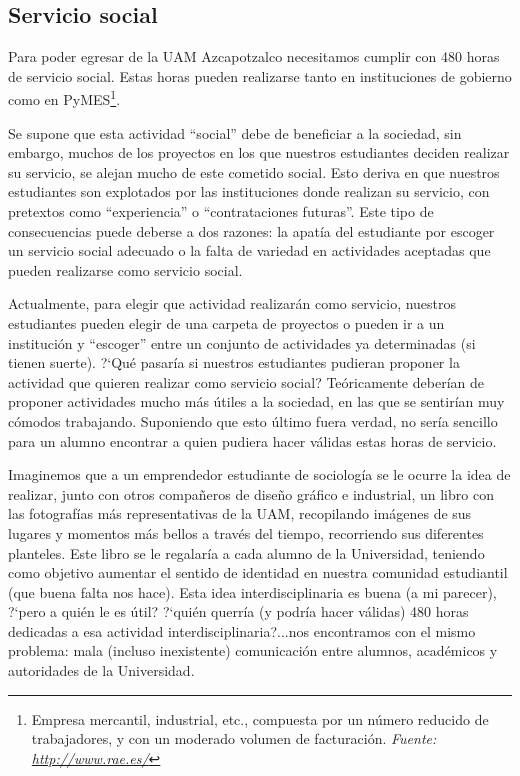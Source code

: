 \documentclass[11pt,letterpaper,titlepage]{article}
\begin{document}
\subsection{Servicio social}

Para poder egresar de la UAM Azcapotzalco necesitamos cumplir con 480 horas de servicio social. Estas horas pueden realizarse tanto en instituciones de gobierno como en PyMES\footnote{Empresa mercantil, industrial, etc., compuesta por un n\'umero reducido de trabajadores, y con un moderado volumen de facturaci\'on. \textit{Fuente: \href{http://www.rae.es/}{http://www.rae.es/}}}.

Se supone que esta actividad ``social'' debe de beneficiar a la sociedad, sin embargo, muchos de los proyectos en los que nuestros estudiantes deciden realizar su servicio, se alejan mucho de este cometido social. Esto deriva en que nuestros estudiantes son explotados por las instituciones donde realizan su servicio, con pretextos como ``experiencia'' o ``contrataciones futuras''. Este tipo de consecuencias puede deberse a dos razones: la apat\'ia del estudiante por escoger un servicio social adecuado o la falta de variedad en actividades aceptadas que pueden realizarse como servicio social.

Actualmente, para elegir que actividad realizar\'an como servicio, nuestros estudiantes pueden elegir de una carpeta de proyectos o pueden ir a un instituci\'on y ``escoger'' entre un conjunto de actividades ya determinadas  (si tienen suerte).  ?`Qu\'e pasar\'ia si nuestros estudiantes pudieran proponer la actividad que quieren realizar como servicio social? Te\'oricamente deber\'ian de proponer actividades mucho m\'as \'utiles a la sociedad, en las que se sentir\'ian muy c\'omodos trabajando. Suponiendo que esto \'ultimo fuera verdad, no ser\'ia sencillo para un alumno encontrar a quien pudiera hacer v\'alidas estas horas de servicio.


Imaginemos que a un emprendedor estudiante de sociolog\'ia se le ocurre la idea de realizar, junto con otros compa\~neros de dise\~no gr\'afico e industrial, un libro con las fotograf\'ias m\'as representativas de la UAM, recopilando im\'agenes de sus lugares y momentos m\'as bellos a trav\'es del tiempo, recorriendo sus diferentes planteles. Este libro se le regalar\'ia a cada alumno de la Universidad, teniendo como objetivo aumentar el sentido de identidad en nuestra comunidad estudiantil (que buena falta nos hace). Esta idea interdisciplinaria es buena (a mi parecer), ?`pero a qui\'en le es \'util? ?`qui\'en querr\'ia (y podr\'ia hacer v\'alidas) 480 horas dedicadas a esa actividad interdisciplinaria?...nos encontramos con el mismo problema: mala (incluso inexistente) comunicaci\'on entre alumnos, acad\'emicos y autoridades de la Universidad.
\end{document}
